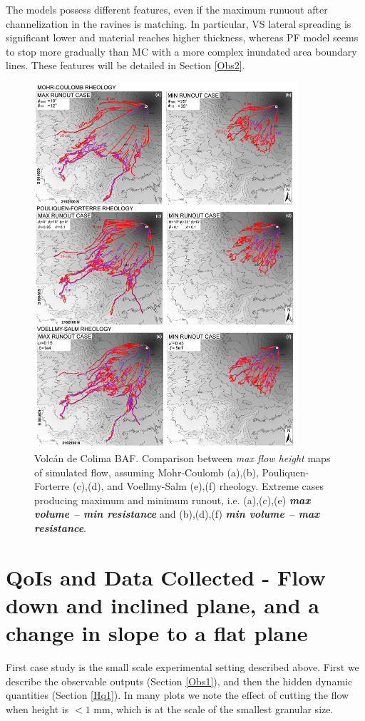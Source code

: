 \documentclass{article}
\begin{document}
The models possess different features, even if the maximum runuout after channelization in the ravines is matching. In particular, VS lateral spreading is significant lower and material reaches higher thickness, whereas PF model seems to stop more gradually than MC with a more complex inundated area boundary lines. These features will be detailed in Section \ref{Obs2}.

\begin{figure}[H]
         \centering
        \includegraphics[width=0.87\textwidth]{Figures/ExtremeMaps.jpg}
        \caption{Volc\'an de Colima BAF. Comparison between \emph{max flow height} maps of simulated flow, assuming Mohr-Coulomb (a),(b), Pouliquen-Forterre (c),(d), and Voellmy-Salm (e),(f) rheology. Extreme cases producing maximum and minimum runout, i.e. (a),(c),(e) \emph{\textbf{max volume -- min resistance}} and (b),(d),(f) \emph{\textbf{min volume -- max resistance}}.}
        \label{Colima-MaxMinExtents}
\end{figure}

\section{QoIs and Data Collected - Flow down and inclined plane, and a change in slope to a flat plane}\label{sec:QoIs}
First case study is the small scale experimental setting described above. First we describe the observable outputs (Section \ref{Obs1}), and then the hidden dynamic quantities (Section \ref{Hq1}). In many plots we note the effect of cutting the flow when height is $<1$ mm, which is at the scale of the smallest granular size.
\end{document}
